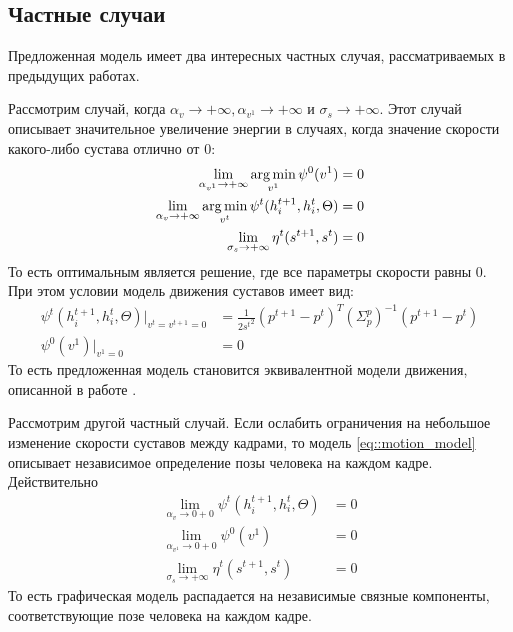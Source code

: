 \subsection{Частные случаи}

Предложенная модель имеет два интересных частных случая, рассматриваемых в предыдущих работах.

Рассмотрим случай, когда $\alpha_v \rightarrow +\infty, \alpha_{v^1} \rightarrow +\infty$ и $\sigma_s \rightarrow +\infty$. Этот случай описывает значительное увеличение энергии в случаях, когда значение скорости какого-либо сустава отлично от $0$:
\begin{equation}
	\begin{aligned}
		\lim_{\alpha_{v^1} \rightarrow +\infty}{\operatorname*{arg\,min}_{v^1} \psi^0(v^1)} &= 0 \\
		\lim_{\alpha_{v} \rightarrow +\infty}{\operatorname*{arg\,min}_{v^t} \psi^t(h_i^{t+1}, h_i^{t}, \Theta)} &= 0 \\
		\lim_{\sigma_s \rightarrow +\infty}{\eta^t(s^{t+1},s^t)} &= 0
	\end{aligned}
\end{equation}
То есть оптимальным является решение, где все параметры скорости равны 0. При этом условии модель движения суставов имеет вид:
\begin{equation}
	\begin{aligned}
		\psi^t(h_i^{t+1}, h_i^{t}, \Theta) |_{v^t = v^{t+1} = 0} &= \frac{1} {2 {s^t}^2}(p^{t+1} - p^t)^T \left(\Sigma_p^p\right)^{-1} (p^{t+1} - p^t) \\
		\psi^0(v^1)|_{v^1=0} &= 0
	\end{aligned}
\end{equation}
То есть предложенная модель становится эквивалентной модели движения, описанной в работе \cite{park2011n}.

Рассмотрим другой частный случай. Если ослабить ограничения на небольшое изменение скорости суставов между кадрами, то модель \eqref{eq::motion_model} описывает независимое определение позы человека на каждом кадре. Действительно
\begin{equation}
	\begin{aligned}
		\lim_{\alpha_{v} \rightarrow 0+0}{\psi^t(h_i^{t+1}, h_i^{t}, \Theta)} &= 0 \\
		\lim_{\alpha_{v^1} \rightarrow 0+0}{\psi^0(v^1)} &= 0 \\
		\lim_{\sigma_s \rightarrow +\infty}{\eta^t(s^{t+1},s^t)} &= 0
	\end{aligned}
\end{equation}
То есть графическая модель распадается на независимые связные компоненты, соответствующие позе человека на каждом кадре.

